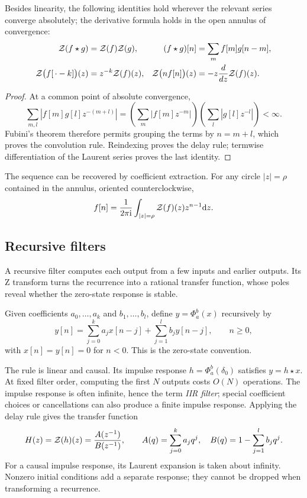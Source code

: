 \begin{prop}
\label{prop-prte-z-trans}
Besides linearity, the following identities hold wherever the relevant
series converge absolutely; the derivative formula holds in the open
annulus of convergence:
\begin{align*}
 \mathcal{Z}(f\star g)&=\mathcal{Z}(f)\mathcal{Z}(g),&
 (f\star g)[n]&=\sum_m f[m]g[n-m],\\
 \mathcal{Z}\bigl(f[\,\cdot-k]\bigr)(z)&=z^{-k}\mathcal{Z}(f)(z),&
 \mathcal{Z}\bigl(nf[n]\bigr)(z)&=-z\frac{d}{dz}\mathcal{Z}(f)(z).
\end{align*}
\end{prop}
\begin{proof}
At a common point of absolute convergence,
\[
 \sum_{m,l}|f[m]g[l]z^{-(m+l)}|
 =\left(\sum_m|f[m]z^{-m}|\right)
  \left(\sum_l|g[l]z^{-l}|\right)<\infty.
\]
Fubini's theorem therefore permits grouping the terms by $n=m+l$,
which proves the convolution rule. Reindexing proves the delay rule;
termwise differentiation of the Laurent series proves the last identity.
\end{proof}
The sequence can be recovered by coefficient extraction. For any circle
$|z|=\rho$ contained in the annulus, oriented counterclockwise,
\[
 f[n]=\frac1{2\pi\mathrm{i}}\int_{|z|=\rho}\mathcal{Z}(f)(z)z^{n-1}\mathrm{d} z.
\]

\subsection{Recursive filters}
\label{sect2-application-trans-z-filters}

A recursive filter computes each output from a few inputs and earlier
outputs. Its Z transform turns the recurrence into a rational transfer
function, whose poles reveal whether the zero-state response is stable.

\begin{defn}
\label{notation-61}
Given coefficients $a_0,\ldots,a_k$ and $b_1,\ldots,b_l$, define
$y=\Phi_a^b(x)$ recursively by
\begin{equation}
\label{eq-defn-recursive-filter}
 y[n]=\sum_{j=0}^k a_jx[n-j]+\sum_{j=1}^l b_jy[n-j],\qquad n\geq0,
\end{equation}
with $x[n]=y[n]=0$ for $n<0$. This is the zero-state convention.
\end{defn}
The rule is linear and causal. Its impulse response $h=\Phi_a^b(\delta_0)$
satisfies $y=h\star x$. At fixed filter order, computing the first $N$
outputs costs $O(N)$ operations. The impulse response is often infinite,
hence the term \emph{IIR filter}; special coefficient choices or
cancellations can also produce a finite impulse response.
Applying the delay rule gives the transfer function
\[
 H(z)=\mathcal{Z}(h)(z)=\frac{A(z^{-1})}{B(z^{-1})},\qquad
 A(q)=\sum_{j=0}^k a_jq^j,\quad B(q)=1-\sum_{j=1}^l b_jq^j.
\]
For a causal impulse response, its Laurent expansion is taken about
infinity. Nonzero initial conditions add a separate response; they cannot
be dropped when transforming a recurrence.

